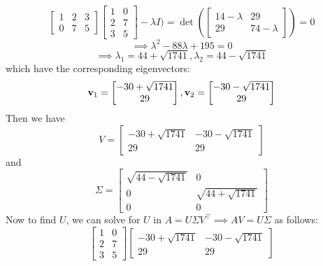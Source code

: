 \documentclass{article}
\newcommand{\bv}{{\bf v}}
\begin{document}
\begin{itemize}
\[\begin{bmatrix}
                              1 & 2 & 3 \\ 0 & 7 & 5
                        \end{bmatrix}\begin{bmatrix}
                              1 & 0 \\ 2 & 7 \\ 3 & 5
                        \end{bmatrix}-\lambda I)=\det(\begin{bmatrix}
                              14-\lambda & 29 \\ 29 & 74-\lambda
                        \end{bmatrix})=0
            \]\[
                  \implies \lambda^2-88\lambda+195=0
            \]\[
                  \implies\lambda_1=44+\sqrt{1741},\lambda_2=44-\sqrt{1741}
            \] which have the corresponding eigenvectors:
            \[
                  \bv_1=\begin{bmatrix}
                        -30+\sqrt{1741} \\29
                  \end{bmatrix},\bv_2=\begin{bmatrix}
                        -30-\sqrt{1741} \\29
                  \end{bmatrix}
            \] Then we have \[
                  \boxed{V=\begin{bmatrix}
                              -30+\sqrt{1741} & -30-\sqrt{1741} \\ 29 & 29
                        \end{bmatrix}}
            \] and \[
                  \boxed{\Sigma=\begin{bmatrix}
                              \sqrt{44-\sqrt{1741}} & 0 \\ 0 & \sqrt{44+\sqrt{1741}} \\ 0 & 0
                        \end{bmatrix}}
            \] Now to find $U$, we can solve for $U$ in $A=U\Sigma V^{\top}\implies AV=U\Sigma$ as follows:
            \[
                  \begin{bmatrix}
                        1 & 0 \\2&7\\3&5
                  \end{bmatrix}\begin{bmatrix}
                        -30+\sqrt{1741} & -30-\sqrt{1741} \\ 29 & 29

\end{bmatrix}\]
\end{itemize}
\end{document}
